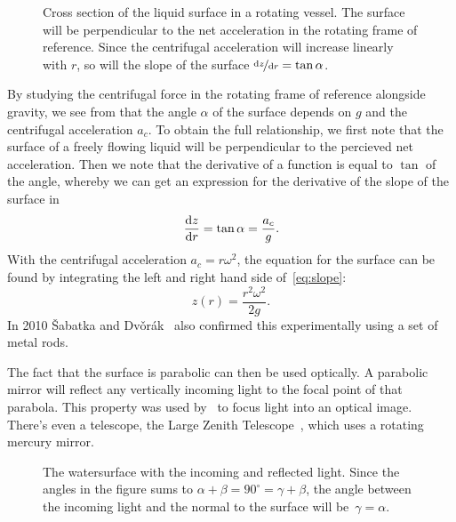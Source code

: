 \documentclass[11pt, a4paper, twocolumn, swedish, english]{article}
\begin{document}
\begin{figure}\centering
\resizebox{1\linewidth}{!}{}
\caption{Cross section of the liquid surface in a rotating vessel. The
  surface will be perpendicular to the net acceleration in the
  rotating frame of reference. Since the centrifugal acceleration will
  increase linearly with $r$, so will the slope of the surface
  ${\nicefrac{\dd{z}}{\dd{r}}=\tan\alpha}$. }
\label{fig:parabola} 
\end{figure}



By studying the centrifugal force in the rotating frame of reference
alongside gravity, we see from  that the 
angle $\alpha$ of the surface depends on $g$ and the centrifugal
acceleration $a_c$. To obtain the full relationship, we first note
that the surface of a freely flowing liquid will be perpendicular to
the percieved net acceleration. Then we note that the derivative of a
function is equal to $\tan$ of the angle, whereby we can get an
expression for the derivative of the slope of the surface in
\begin{equation}\label{eq:slope}
\dv{z}{r} = \tan\alpha = \frac{a_c}{g}.
\end{equation}
With the centrifugal acceleration $a_c=r\omega^2$, the equation
for the surface can be found by integrating the left and right hand
side of~\eqref{eq:slope}: 
\begin{equation}\label{eq:parabola}
z(r)=\frac{r^2\omega^2}{2g}.
\end{equation}
In 2010 \v{S}abatka and
Dv\v{o}rák~\cite{Sabatka2010} also confirmed this experimentally using
a set of metal rods. 

The fact that the surface is parabolic can then be used optically. A
parabolic mirror will reflect any vertically incoming light to the
focal point of that parabola. This property was used
by~\cite{Berg1990} to focus light into an optical image. There's even
a telescope, the Large Zenith Telescope~\cite{LargeZenith}, which uses
a rotating mercury mirror. 

\begin{figure}\centering
\resizebox{.55\linewidth}{!}{}
\caption{The watersurface with the incoming and reflected light. Since
  the angles in the figure sums to
$\alpha+\beta= 90^\circ = \gamma+\beta$, the angle between the incoming
light and the normal to the surface will be~$\gamma=\alpha$. }
\label{fig:angles} 
\end{figure}
\end{document}
